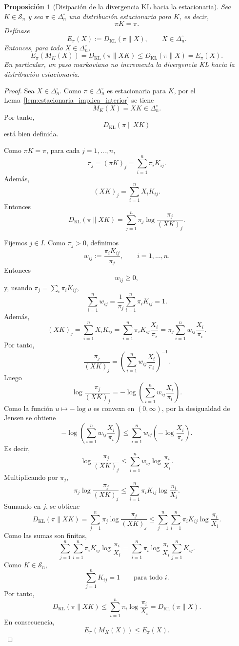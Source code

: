 \documentclass[12pt]{article}
\newtheorem{proposicion}{Proposición}[section]
\begin{document}
\begin{proposicion}[Disipación de la divergencia KL hacia la estacionaria]\label{prop:disipacion_KL_markov}
Sea \(K\in\mathcal S_n\) y sea \(\pi\in\Delta_n^\circ\) una distribución estacionaria para \(K\), es decir,
\[
\pi K=\pi.
\]
Defínase
\[
E_\pi(X):=D_{\mathrm{KL}}(\pi\|X),
\qquad X\in\Delta_n^\circ.
\]
Entonces, para todo \(X\in\Delta_n^\circ\),
\[
E_\pi(M_K(X))
=
D_{\mathrm{KL}}(\pi\|XK)
\le
D_{\mathrm{KL}}(\pi\|X)
=
E_\pi(X).
\]
En particular, un paso markoviano no incrementa la divergencia KL hacia la distribución estacionaria.
\end{proposicion}

\begin{proof}
Sea \(X\in\Delta_n^\circ\). Como \(\pi\in\Delta_n^\circ\) es estacionaria para \(K\), por el Lema~\ref{lem:estacionaria_implica_interior} se tiene
\[
M_K(X)=XK\in\Delta_n^\circ.
\]
Por tanto,
\[
D_{\mathrm{KL}}(\pi\|XK)
\]
está bien definida.

Como \(\pi K=\pi\), para cada \(j=1,\dots,n\),
\[
\pi_j=(\pi K)_j=\sum_{i=1}^n\pi_iK_{ij}.
\]
Además,
\[
(XK)_j=\sum_{i=1}^n X_iK_{ij}.
\]
Entonces
\[
D_{\mathrm{KL}}(\pi\|XK)
=
\sum_{j=1}^n
\pi_j
\log\frac{\pi_j}{(XK)_j}.
\]

Fijemos \(j\in I\). Como \(\pi_j>0\), definimos
\[
w_{ij}:=\frac{\pi_iK_{ij}}{\pi_j},
\qquad i=1,\dots,n.
\]
Entonces
\[
w_{ij}\ge 0,
\]
y, usando \(\pi_j=\sum_i\pi_iK_{ij}\),
\[
\sum_{i=1}^n w_{ij}
=
\frac{1}{\pi_j}
\sum_{i=1}^n\pi_iK_{ij}
=
1.
\]
Además,
\[
(XK)_j
=
\sum_{i=1}^n X_iK_{ij}
=
\sum_{i=1}^n
\pi_iK_{ij}\frac{X_i}{\pi_i}
=
\pi_j\sum_{i=1}^n w_{ij}\frac{X_i}{\pi_i}.
\]
Por tanto,
\[
\frac{\pi_j}{(XK)_j}
=
\left(
\sum_{i=1}^n w_{ij}\frac{X_i}{\pi_i}
\right)^{-1}.
\]
Luego
\[
\log\frac{\pi_j}{(XK)_j}
=
-\log\left(
\sum_{i=1}^n w_{ij}\frac{X_i}{\pi_i}
\right).
\]
Como la función \(u\mapsto-\log u\) es convexa en \((0,\infty)\), por la desigualdad de Jensen se obtiene
\[
-\log\left(
\sum_{i=1}^n w_{ij}\frac{X_i}{\pi_i}
\right)
\le
\sum_{i=1}^n
w_{ij}
\left(
-\log\frac{X_i}{\pi_i}
\right).
\]
Es decir,
\[
\log\frac{\pi_j}{(XK)_j}
\le
\sum_{i=1}^n
w_{ij}
\log\frac{\pi_i}{X_i}.
\]
Multiplicando por \(\pi_j\),
\[
\pi_j
\log\frac{\pi_j}{(XK)_j}
\le
\sum_{i=1}^n
\pi_iK_{ij}
\log\frac{\pi_i}{X_i}.
\]
Sumando en \(j\), se obtiene
\[
D_{\mathrm{KL}}(\pi\|XK)
=
\sum_{j=1}^n
\pi_j
\log\frac{\pi_j}{(XK)_j}
\le
\sum_{j=1}^n
\sum_{i=1}^n
\pi_iK_{ij}
\log\frac{\pi_i}{X_i}.
\]
Como las sumas son finitas,
\[
\sum_{j=1}^n
\sum_{i=1}^n
\pi_iK_{ij}
\log\frac{\pi_i}{X_i}
=
\sum_{i=1}^n
\pi_i
\log\frac{\pi_i}{X_i}
\sum_{j=1}^nK_{ij}.
\]
Como \(K\in\mathcal S_n\),
\[
\sum_{j=1}^nK_{ij}=1
\qquad
\text{para todo }i.
\]
Por tanto,
\[
D_{\mathrm{KL}}(\pi\|XK)
\le
\sum_{i=1}^n
\pi_i
\log\frac{\pi_i}{X_i}
=
D_{\mathrm{KL}}(\pi\|X).
\]
En consecuencia,
\[
E_\pi(M_K(X))\le E_\pi(X).
\]
\end{proof}
\end{document}
